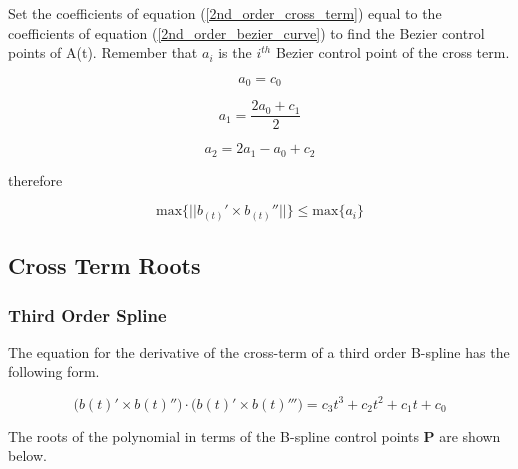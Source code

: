 \documentclass{article}
\begin{document}
Set the coefficients of equation (\ref{2nd_order_cross_term}) equal to the coefficients of equation (\ref{2nd_order_bezier_curve}) to find the Bezier control points of A(t). Remember that \(a_i\) is the \(i^{th}\) Bezier control point of the cross term. 


\begin{equation}
    a_0 = c_0
\end{equation}

\begin{equation}
    a_1 = \frac{2a_0 + c_1}{2}
\end{equation}

\begin{equation}
    a_2 = 2a_1 - a_0 + c_2
\end{equation}

therefore

\begin{equation}
    \text{max}\{||b_{(t)}' \times b_{(t)}''||\} \leq \text{max}\{a_i \}
\end{equation}


\subsection{Cross Term Roots}

\subsubsection{Third Order Spline}

The equation for the derivative of the cross-term of a third order B-spline has the following form.

\begin{equation}
    \big(b(t)' \times b(t)''\big) \cdot \big(b(t)' \times b(t)'''\big) = c_3 t^3 + c_2 t^2 + c_1 t + c_0
\end{equation}

The roots of the polynomial in terms of the B-spline control points \textbf{P} are shown below.
\end{document}
